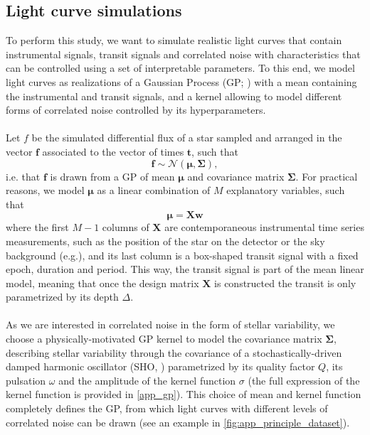 \documentclass[modern]{aastex631}
\begin{document}
\subsection{Light curve simulations}\label{light_curves_simulations}
To perform this study, we want to simulate realistic light curves that contain instrumental signals, transit signals and correlated noise with characteristics that can be controlled using a set of interpretable parameters. To this end, we model light curves as realizations of a Gaussian Process (GP; \citealt{Rasmussen2005}) with a mean containing the instrumental and transit signals, and a kernel allowing to model different forms of correlated noise controlled by its hyperparameters.\\\\
Let $f$ be the simulated differential flux of a star sampled and arranged in the vector $\bm{f}$ associated to the vector of times $\bm{t}$, such that
\begin{equation*}
    \bm{f} \sim \mathcal{N}(\bm{\mu}, \bm{\Sigma}),
\end{equation*}
i.e. that $\bm{f}$ is drawn from a GP of mean $\bm{\mu}$ and covariance matrix $\bm{\Sigma}$. For practical reasons, we model $\bm{\mu}$ as a linear combination of $M$ explanatory variables, such that
\begin{equation}\label{eq:linear_model}
    \bm{\mu} = \bm{X w}
\end{equation}
where the first $M-1$ columns of $\bm{X}$ are contemporaneous instrumental time series measurements, such as the position of the star on the detector or the sky background (e.g.\;\cite{}), and its last column is a box-shaped transit signal with a fixed epoch, duration and period. This way, the transit signal is part of the mean linear model, meaning that once the design matrix $\bm{X}$ is constructed the transit is only parametrized by its depth $\Delta$.\\\\
As we are interested in correlated noise in the form of stellar variability, we choose a physically-motivated GP kernel to model the covariance matrix $\bm{\Sigma}$, describing stellar variability through the covariance of a stochastically-driven damped harmonic oscillator (SHO, \citealt{celerite, celerite2}) parametrized by its quality factor $Q$, its pulsation $\omega$ and the amplitude of the kernel function $\sigma$ (the full expression of the kernel function is provided in \autoref{app_gp}). This choice of mean and kernel function completely defines the GP, from which light curves with different levels of correlated noise can be drawn (see an example in \autoref{fig:app_principle_dataset}).
\end{document}
